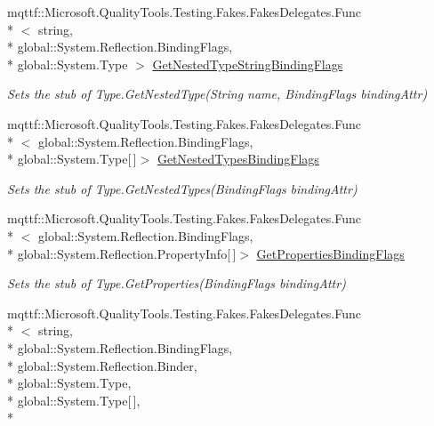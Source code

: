 \begin{DoxyCompactItemize}
mqttf\-::\-Microsoft.\-Quality\-Tools.\-Testing.\-Fakes.\-Fakes\-Delegates.\-Func\\*
$<$ string, \\*
global\-::\-System.\-Reflection.\-Binding\-Flags, \\*
global\-::\-System.\-Type $>$ \hyperlink{class_system_1_1_fakes_1_1_stub_type_a8461d11125d0330dccfbc9996c5b721a}{Get\-Nested\-Type\-String\-Binding\-Flags}
\begin{DoxyCompactList}\small\item\em Sets the stub of Type.\-Get\-Nested\-Type(\-String name, Binding\-Flags binding\-Attr)\end{DoxyCompactList}\item 
mqttf\-::\-Microsoft.\-Quality\-Tools.\-Testing.\-Fakes.\-Fakes\-Delegates.\-Func\\*
$<$ global\-::\-System.\-Reflection.\-Binding\-Flags, \\*
global\-::\-System.\-Type\mbox{[}$\,$\mbox{]}$>$ \hyperlink{class_system_1_1_fakes_1_1_stub_type_a2602bee550afdbb11adbbe8c93bf7292}{Get\-Nested\-Types\-Binding\-Flags}
\begin{DoxyCompactList}\small\item\em Sets the stub of Type.\-Get\-Nested\-Types(\-Binding\-Flags binding\-Attr)\end{DoxyCompactList}\item 
mqttf\-::\-Microsoft.\-Quality\-Tools.\-Testing.\-Fakes.\-Fakes\-Delegates.\-Func\\*
$<$ global\-::\-System.\-Reflection.\-Binding\-Flags, \\*
global\-::\-System.\-Reflection.\-Property\-Info\mbox{[}$\,$\mbox{]}$>$ \hyperlink{class_system_1_1_fakes_1_1_stub_type_a3f32427292b741aedae7c277722e6e2b}{Get\-Properties\-Binding\-Flags}
\begin{DoxyCompactList}\small\item\em Sets the stub of Type.\-Get\-Properties(\-Binding\-Flags binding\-Attr)\end{DoxyCompactList}\item 
mqttf\-::\-Microsoft.\-Quality\-Tools.\-Testing.\-Fakes.\-Fakes\-Delegates.\-Func\\*
$<$ string, \\*
global\-::\-System.\-Reflection.\-Binding\-Flags, \\*
global\-::\-System.\-Reflection.\-Binder, \\*
global\-::\-System.\-Type, \\*
global\-::\-System.\-Type\mbox{[}$\,$\mbox{]}, \\*

\end{DoxyCompactItemize}
